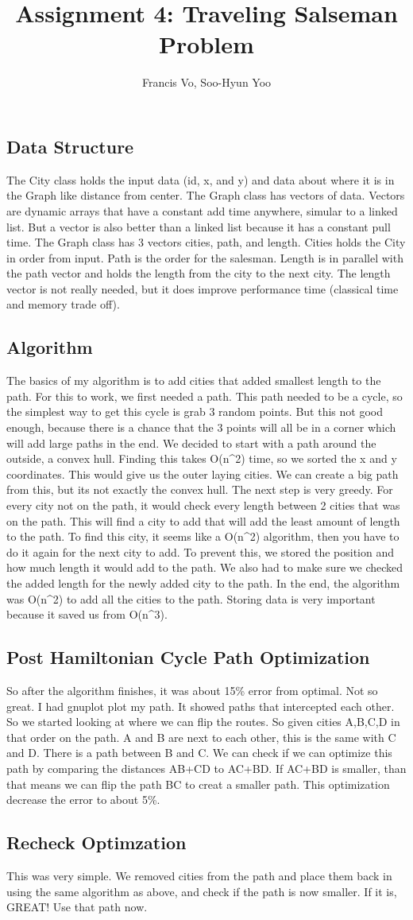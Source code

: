 \documentclass[letterpaper,10pt]{article}
\title{Assignment 4: Traveling Salseman Problem}
\author{Francis Vo, Soo-Hyun Yoo}
\begin{document}
	\subsection{Data Structure}
		The City class holds the input data (id, x, and y) and data about where it is in the Graph like distance from center. The Graph class has vectors of data. Vectors are dynamic arrays that have a constant add time anywhere, simular to a linked list.  But a vector is also better than a linked list because it has a constant pull time.  The Graph class has 3 vectors cities, path, and length.  Cities holds the City in order from input.  Path is the order for the salesman.  Length is in parallel with the path vector and holds the length from the city to the next city. The length vector is not really needed, but it does improve performance time (classical time and memory trade off). 

	\subsection{Algorithm}
		The basics of my algorithm is to add cities that added smallest length to the path.  For this to work, we first needed a path.  This path needed to be a cycle, so the simplest way to get this cycle is grab 3 random points.  But this not good enough, because there is a chance that the 3 points will all be in a corner which will add large paths in the end.  We decided to start with a path around the outside, a convex hull.  Finding this takes O(n^2) time, so we sorted the x and y coordinates.  This would give us the outer laying cities. We can create a big path from this, but its not exactly the convex hull. The next step is very greedy. For every city not on the path, it would check every length between 2 cities that was on the path.  This will find a city to add that will add the least amount of length to the path.  To find this city, it seems like a O(n^2) algorithm, then you have to do it again for the next city to add. To prevent this, we stored the position and how much length it would add to the path. We also had to make sure we checked the added length for the newly added city to the path.  In the end, the algorithm was O(n^2) to add all the cities to the path.  Storing data is very important because it saved us from O(n^3). 

	\subsection{Post Hamiltonian Cycle Path Optimization}
		So after the algorithm finishes, it was about 15\% error from optimal.  Not so great.  I had gnuplot plot my path.  It showed paths that intercepted each other.  So we started looking at where we can flip the routes.  So given cities A,B,C,D in that order on the path. A and B are next to each other, this is the same with C and D.  There is a path between B and C.  We can check if we can optimize this path by comparing the distances AB+CD to AC+BD.  If AC+BD is smaller, than that means we can flip the path BC to creat a smaller path.  This optimization decrease the error to about 5\%.

	\subsection{Recheck Optimzation}
		This was very simple. We removed cities from the path and place them back in using the same algorithm as above, and check if the path is now smaller. If it is, GREAT! Use that path now. 
\end{document}
